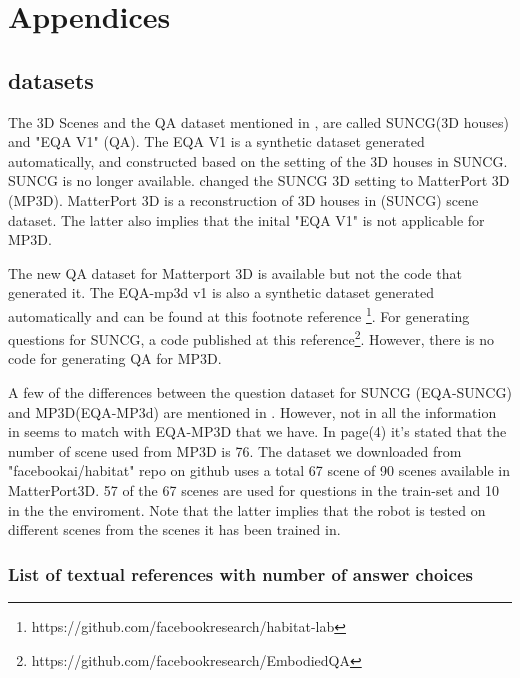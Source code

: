 \documentclass[11pt, a4paper]{article}
\begin{document}


\newpage
\section{Appendices}


\subsection{datasets} 

The 3D Scenes and the QA dataset mentioned in \cite{embodiedqa}, are called SUNCG(3D houses) and "EQA V1" (QA). The EQA V1 is a synthetic dataset generated automatically, and constructed based on the setting of the 3D houses in SUNCG. SUNCG is no longer available. \cite{embodiedqa} changed the SUNCG 3D setting to MatterPort 3D (MP3D). MatterPort 3D is a reconstruction of 3D houses in (SUNCG) scene dataset. The latter also implies that the inital "EQA V1" is not applicable for MP3D. 

The new QA dataset for Matterport 3D is available but not the code that generated it. The EQA-mp3d v1 is also a synthetic dataset generated automatically and can be found at this footnote reference \footnote{https://github.com/facebookresearch/habitat-lab}. For generating  questions for SUNCG, a code published at this reference\footnote{https://github.com/facebookresearch/EmbodiedQA}. However, there is no code for generating QA for MP3D. 
 
A few of the differences between the question dataset for SUNCG (EQA-SUNCG) and MP3D(EQA-MP3d) are mentioned in \cite{eqa_matterport}. However, not in all the information in  \cite{eqa_matterport} seems to match with EQA-MP3D that we have. In  \cite{eqa_matterport} page(4) it's stated that the number of scene used from MP3D is 76. The dataset we downloaded from "facebookai/habitat" repo on github uses a total 67 scene of 90 scenes available in MatterPort3D. 57 of the 67 scenes are used for questions in the train-set and 10 in the the enviroment. Note that the latter implies that the robot is tested on different scenes from the scenes it has been trained in. 


\subsubsection{List of textual references with number of answer choices}
\end{document}
